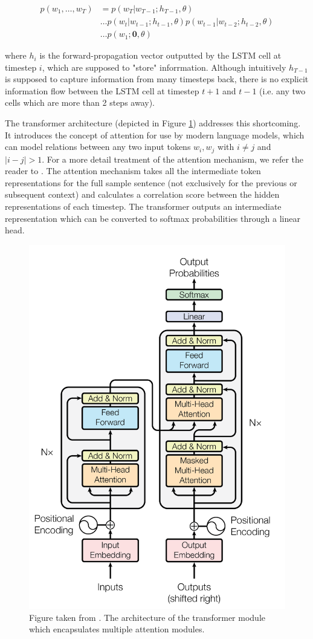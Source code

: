 \documentclass[a4paper,12pt,oneside,openright]{report}
\begin{document}
\begin{align}
p(w_1, \ldots, w_T) &= p(w_T | w_{T-1}; h_{T-1}, \theta) \nonumber  \\
& \ldots p(w_t | w_{t-1}; h_{t-1}, \theta) p(w_{t-1} | w_{t-2}; h_{t-2}, \theta) \nonumber \\
& \ldots p(w_1 ; \mathbf{0}, \theta) 
\end{align}

where $h_{i}$ is the forward-propagation vector outputted by the LSTM cell at timestep $i$, which are supposed to "store" inforrmation.
Although intuitively $h_{T-1}$ is supposed to capture information from many timesteps back, there is no explicit information flow between the LSTM cell at timestep $t+1$ and $t-1$ (i.e. any two cells which are more than 2 steps away).

The transformer architecture \cite{vaswani17} (depicted in Figure \ref{fig:attention_is_all_you_need}) addresses this shortcoming.
It introduces the concept of attention for use by modern language models, which can model relations between any two input tokens $w_i, w_j$ with $i \neq j$ and $| i - j |  > 1$.
For a more detail treatment of the attention mechanism, we refer the reader to \cite{bahdanau16}.
The attention mechanism takes all the intermediate token representations for the full sample sentence (not exclusively for the previous or subsequent context) and calculates a correlation score between the hidden representations of each timestep.
The transformer outputs an intermediate representation which can be converted to softmax probabilities through a linear head.

\begin{figure}[H]
	\center
  \includegraphics[width=0.5\linewidth]{./assets/background/transformer_module.png}
  \caption{Figure taken from \cite{vaswani17}. The architecture of the transformer module which encapsulates multiple attention modules.}
  \label{fig:attention_is_all_you_need}
\end{figure}
\end{document}
